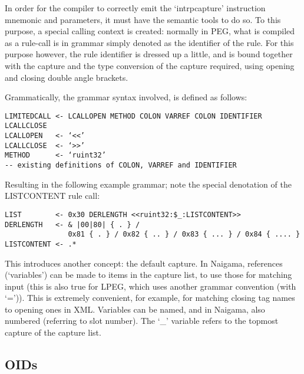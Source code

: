 In order for the compiler to correctly emit the ‘intrpcapture’ 
instruction mnemonic and parameters, it must have the semantic tools to do 
so. To this purpose, a special calling context is created: normally in 
PEG, what is compiled as a rule-call is in grammar simply denoted as the 
identifier of the rule. For this purpose however, the rule identifier is 
dressed up a little, and is bound together with the capture and the type 
conversion of the capture required, using opening and closing double angle 
brackets.

Grammatically, the grammar syntax involved, is defined as follows:

\begin{changemargin}{-60mm}{0mm}
\begin{myquote}
\begin{verbatim}
LIMITEDCALL <- LCALLOPEN METHOD COLON VARREF COLON IDENTIFIER LCALLCLOSE
LCALLOPEN   <- ‘<<’
LCALLCLOSE  <- ‘>>’
METHOD      <- ‘ruint32’
-- existing definitions of COLON, VARREF and IDENTIFIER
\end{verbatim}
\end{myquote}
\end{changemargin}

Resulting in the following example grammar; note the special denotation of 
the LISTCONTENT rule call:

\begin{changemargin}{-60mm}{0mm}
\begin{myquote}
\begin{verbatim}
LIST        <- 0x30 DERLENGTH <<ruint32:$_:LISTCONTENT>>
DERLENGTH   <- & |00|80| { . } /
               0x81 { . } / 0x82 { .. } / 0x83 { ... } / 0x84 { .... }
LISTCONTENT <- .*
\end{verbatim}
\end{myquote}
\end{changemargin}

This introduces another concept: the default capture. In Naigama, 
references (‘variables’) can be made to items in the capture list, to 
use those for matching input (this is also true for LPEG, which uses 
another grammar convention (with ‘=’)). This is extremely convenient, 
for example, for matching closing tag names to opening ones in XML. 
Variables can be named, and in Naigama, also numbered (referring to slot 
number). The ‘\_’ variable refers to the topmost capture of the capture 
list.

\subsection{OIDs}

